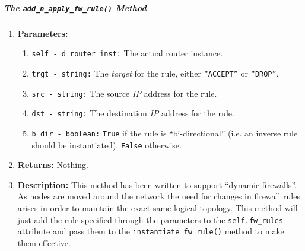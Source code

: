         \subparagraph{The \texttt{add\_n\_apply\_fw\_rule()} Method}
            \begin{enumerate}
                \item \textbf{Parameters:}
                \begin{enumerate}
                    \item \texttt{self - d\_router\_inst:} The actual router instance.
                    \item \texttt{trgt - string:} The \textit{target} for the rule, either \texttt{``ACCEPT''} or \texttt{``DROP''}.
                    \item \texttt{src - string:} The source \textit{IP} address for the rule.
                    \item \texttt{dst - string:} The destination \textit{IP} address for the rule.
                    \item \texttt{b\_dir - boolean:} \texttt{True} if the rule is ``bi-directional'' (i.e. an inverse rule should be instantiated). \texttt{False} otherwise.
                \end{enumerate}
                \item \textbf{Returns:} Nothing.
                \item \textbf{Description:} This method has been written to support ``dynamic firewalls''. As nodes are moved around the network the need for changes in firewall rules arises in order to maintain the exact same logical topology. This method will just add the rule specified through the parameters to the \texttt{self.fw\_rules} attribute and pass them to the \texttt{instantiate\_fw\_rule()} method to make them effective.
            \end{enumerate}

